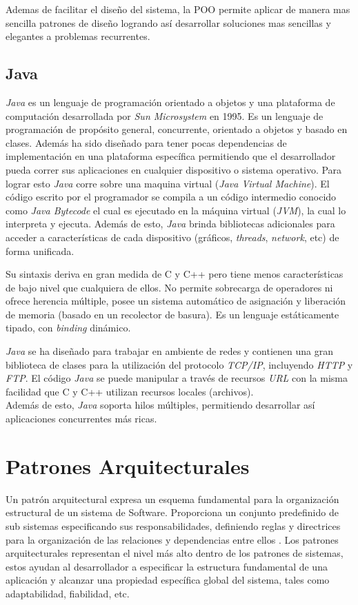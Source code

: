 Ademas de facilitar el dise\~no del sistema, la POO permite aplicar de manera mas sencilla patrones de dise\~no logrando as\'i desarrollar soluciones mas sencillas y elegantes a problemas recurrentes.

\subsection{Java}
\textit{Java} es un lenguaje de programaci\'on orientado a objetos y una plataforma de computaci\'on desarrollada por \textit{Sun Microsystem} en 1995. Es un lenguaje de programaci\'on de prop\'osito general, concurrente, orientado a objetos y basado en clases. Adem\'as ha sido dise\~nado para tener pocas dependencias de implementaci\'on en una plataforma espec\'ifica permitiendo que el desarrollador pueda correr sus aplicaciones en cualquier dispositivo o sistema operativo. Para lograr esto \textit{Java} corre sobre una maquina virtual (\textit{Java Virtual Machine}). El c\'odigo escrito por el programador se compila a un c\'odigo intermedio conocido como \textit{Java Bytecode} el cual es ejecutado en la m\'aquina virtual (\textit{JVM}), la cual lo interpreta y ejecuta. Adem\'as de esto, \textit{Java} brinda bibliotecas adicionales para acceder a caracter\'isticas de cada dispositivo (gr\'aficos, \textit{threads}, \textit{network}, etc) de forma unificada.

Su sintaxis deriva en gran medida de C y C++ pero tiene menos caracter\'isticas de bajo nivel que cualquiera de ellos. No permite sobrecarga de operadores ni ofrece herencia m\'ultiple, posee un sistema autom\'atico de asignaci\'on y liberaci\'on de memoria (basado en un recolector de basura). Es un lenguaje est\'aticamente tipado, con \textit{binding} din\'amico.

\textit{Java} se ha dise\~nado para trabajar en ambiente de redes y contienen una gran biblioteca de clases para la utilizaci\'on del protocolo \textit{TCP/IP}, incluyendo \textit{HTTP} y \textit{FTP}. El c\'odigo \textit{Java} se puede manipular a trav\'es de recursos \textit{URL} con la misma facilidad que C y C++ utilizan recursos locales (archivos).\\
Adem\'as de esto, \textit{Java} soporta hilos m\'ultiples, permitiendo desarrollar as\'i aplicaciones concurrentes m\'as ricas.

\section{Patrones Arquitecturales}
Un patr\'on arquitectural expresa un esquema fundamental para la organizaci\'on estructural de un sistema de Software. Proporciona un conjunto predefinido de sub sistemas especificando sus responsabilidades, definiendo reglas y directrices para la organizaci\'on de las relaciones y dependencias entre ellos \cite{patarq}. Los patrones arquitecturales representan el nivel m\'as alto dentro de los patrones de sistemas, estos ayudan al desarrollador a especificar la estructura fundamental de una aplicaci\'on y alcanzar una propiedad espec\'ifica global del sistema, tales como adaptabilidad, fiabilidad, etc.

